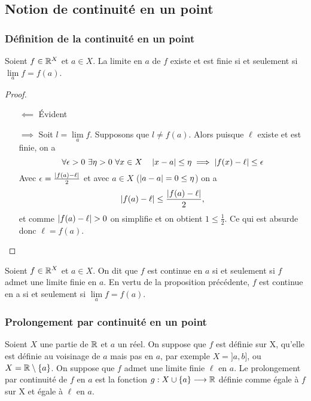 \subsection{Notion de continuité en un point}

\subsubsection{Définition de la continuité en un point}

\begin{prop}
  Soient $f \in \mathbb{R}^X$ et $a \in X$. La limite en $a$ de $f$ existe et est finie si et seulement si $\lim\limits_{a} f = f(a)$.
\end{prop}
\begin{proof}
  \begin{itemize}
  \item[$\impliedby$] Évident
  \item[$\implies$] Soit $l=\lim\limits_{a} f$. Supposons que $l \neq f(a)$. Alors puisque $\ell$ existe et est finie, on a
    \begin{equation}
      \forall \epsilon > 0 \ \exists \eta > 0 \ \forall x \in X \quad \left\lvert x-a\right\rvert \leq \eta \implies \left\lvert f(x)-\ell\right\rvert \leq \epsilon
    \end{equation}
    Avec $\epsilon=\frac{\left\lvert f(a)-\ell\right\rvert}{2}$ et avec $a \in X$ ($\left\lvert a-a\right\rvert=0 \leq \eta$) on a
    \begin{equation}
      \left\lvert f(a)-\ell\right\rvert \leq \frac{\left\lvert f(a)-\ell\right\rvert}{2},
    \end{equation}
    et comme $\left\lvert f(a)-\ell\right\rvert > 0$ on simplifie et on obtient $1 \leq \frac{1}{2}$. Ce qui est absurde donc $\ell=f(a)$.
  \end{itemize}
\end{proof}
\begin{defdef}
  Soient $f \in \mathbb{R}^X$ et $a \in X$. On dit que $f$ est continue en $a$ si et seulement si $f$ admet une limite finie en $a$. En vertu de la proposition précédente, $f$ est continue en a si et seulement si $\lim\limits_{a} f = f(a)$.
\end{defdef}

\subsubsection{Prolongement par continuité en un point}

Soient $X$ une partie de $\mathbb{R}$ et $a$ un réel. On suppose que $f$ est définie sur X, qu'elle est définie au voisinage de $a$ mais pas en $a$, par exemple $X=]a,b]$, ou $X=\mathbb{R}\setminus\{a\}$. On suppose que $f$ admet une limite finie $\ell$ en $a$. Le prolongement par continuité de $f$ en $a$ est la fonction $g:X\cup\{a\} \longrightarrow \mathbb{R}$ définie comme égale à $f$ sur X et égale à $\ell$ en $a$.

